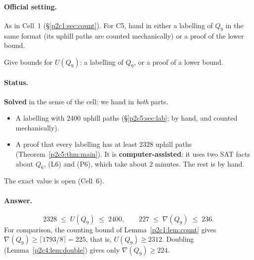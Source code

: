 
\paragraph{Official setting.} As in Cell~1 (\S\ref{p2c1:sec:count}). For C5, hand in either a
labelling of $Q_9$ in the same format (its uphill paths are counted mechanically) or a proof of
the lower bound.

\begin{statement}
Give bounds for $U(Q_9)$: a labelling of $Q_9$, or a proof of a lower bound.
\end{statement}

\paragraph{Status.} \textbf{Solved} in the sense of the cell: we hand in \emph{both} parts.
\begin{itemize}
\item A labelling with $2400$ uphill paths (\S\ref{p2c5:sec:lab}; by hand, and counted
  mechanically).
\item A proof that every labelling has at least $2328$ uphill paths
  (Theorem~\ref{p2c5:thm:main}). It is \textbf{computer-assisted}: it uses two SAT facts about
  $Q_6$, (L6) and (P6), which take about $2$ minutes. The rest is by hand.
\end{itemize}
The exact value is open (Cell~6).

\paragraph{Answer.}
\[
  2328\;\le\;U(Q_9)\;\le\;2400,\qquad 227\;\le\;\nabla(Q_9)\;\le\;236 .
\]
For comparison, the counting bound of Lemma~\ref{p2c1:lem:count} gives
$\nabla(Q_9)\ge\lceil1793/8\rceil=225$, that is, $U(Q_9)\ge2312$. Doubling
(Lemma~\ref{p2c4:lem:double}) gives only $\nabla(Q_9)\ge224$.

